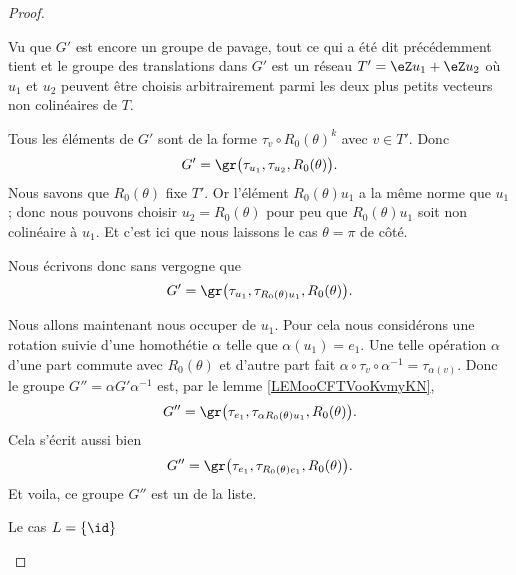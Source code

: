 \begin{proof}
\begin{subproof}
                Vu que \( G'\) est encore un groupe de pavage, tout ce qui a été dit précédemment tient et le groupe des translations dans \( G'\) est un réseau \( T'=\eZ u_1+\eZ u_2\) où \( u_1\) et \( u_2\) peuvent être choisis arbitrairement parmi les deux plus petits vecteurs non colinéaires de \( T\).

                Tous les éléments de \( G'\) sont de la forme \( \tau_v\circ R_0(\theta)^k\) avec \( v\in T'\). Donc
                \begin{equation}        \label{EQooUUDQooQpRcIi}
                    G'=\gr\big(\tau_{u_1}, \tau_{u_2}, R_0(\theta)\big).
                \end{equation}
                Nous savons que \( R_0(\theta)\) fixe \( T'\). Or l'élément \( R_0(\theta)u_1\) a la même norme que \( u_1\); donc nous pouvons choisir \( u_2=R_0(\theta)\) pour peu que \( R_0(\theta)u_1\) soit non colinéaire à \( u_1\). Et c'est ici que nous laissons le cas \( \theta=\pi\) de côté.

                Nous écrivons donc sans vergogne que
                \begin{equation}
                    G'=\gr\big(\tau_{u_1}, \tau_{R_0(\theta)u_1}, R_0(\theta)\big).
                \end{equation}
                
                Nous allons maintenant nous occuper de \( u_1\). Pour cela nous considérons une rotation suivie d'une homothétie \( \alpha\) telle que \( \alpha(u_1)=e_1\). Une telle opération \( \alpha\) d'une part commute avec \( R_0(\theta)\) et d'autre part fait \( \alpha\circ \tau_v\circ\alpha^{-1}=\tau_{\alpha(v)}\). Donc le groupe \( G''=\alpha G'\alpha^{-1}\) est, par le lemme \ref{LEMooCFTVooKvmyKN},
                \begin{equation}
                    G''=\gr\big( \tau_{e_1}, \tau_{\alpha R_0(\theta)u_1}, R_0(\theta) \big).
                \end{equation}
                Cela s'écrit aussi bien
                \begin{equation}
                    G''=\gr\big( \tau_{e_1}, \tau_{R_0(\theta)e_1}, R_0(\theta) \big).
                \end{equation}
                Et voila, ce groupe \( G''\) est un de la liste.

            \item[Le cas \( L=\{ \id \}\)]


\end{subproof}
\end{proof}
